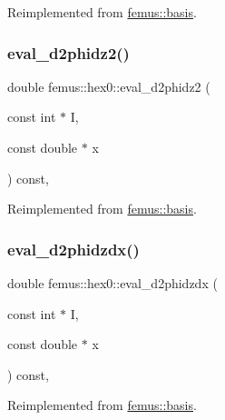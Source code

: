 Reimplemented from \mbox{\hyperlink{classfemus_1_1basis_ab9e060e9c9e763d8c10fdffcc5e0b774}{femus\+::basis}}.

\mbox{\label{classfemus_1_1hex0_a8b54d2de54c8c30de2ead325c661a428}} 
\subsubsection{\texorpdfstring{eval\+\_\+d2phidz2()}{eval\_d2phidz2()}}
{\footnotesize\ttfamily double femus\+::hex0\+::eval\+\_\+d2phidz2 (\begin{DoxyParamCaption}\item[{const int $\ast$}]{I,  }\item[{const double $\ast$}]{x }\end{DoxyParamCaption}) const\hspace{0.3cm}{\ttfamily [inline]}, {\ttfamily [virtual]}}



Reimplemented from \mbox{\hyperlink{classfemus_1_1basis_a9d32da05f49ba2c989fec04fb7836c39}{femus\+::basis}}.

\mbox{\label{classfemus_1_1hex0_a7ccc33fa4e1701fbbae72b174c7ca4f1}} 
\subsubsection{\texorpdfstring{eval\+\_\+d2phidzdx()}{eval\_d2phidzdx()}}
{\footnotesize\ttfamily double femus\+::hex0\+::eval\+\_\+d2phidzdx (\begin{DoxyParamCaption}\item[{const int $\ast$}]{I,  }\item[{const double $\ast$}]{x }\end{DoxyParamCaption}) const\hspace{0.3cm}{\ttfamily [inline]}, {\ttfamily [virtual]}}



Reimplemented from \mbox{\hyperlink{classfemus_1_1basis_a5d619ec5bd57b7d2dc34a99d69975c77}{femus\+::basis}}.

\mbox{\label{classfemus_1_1hex0_a6af64d193c685d7d54a589f9cee5a24b}} 
